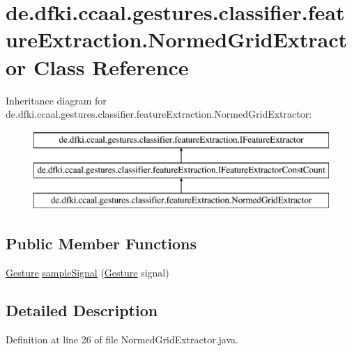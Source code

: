 \hypertarget{classde_1_1dfki_1_1ccaal_1_1gestures_1_1classifier_1_1feature_extraction_1_1_normed_grid_extractor}{\section{de.\-dfki.\-ccaal.\-gestures.\-classifier.\-feature\-Extraction.\-Normed\-Grid\-Extractor Class Reference}
\label{classde_1_1dfki_1_1ccaal_1_1gestures_1_1classifier_1_1feature_extraction_1_1_normed_grid_extractor}
}
Inheritance diagram for de.\-dfki.\-ccaal.\-gestures.\-classifier.\-feature\-Extraction.\-Normed\-Grid\-Extractor\-:\begin{figure}[H]
\begin{center}
\leavevmode
\includegraphics[height=3.000000cm]{classde_1_1dfki_1_1ccaal_1_1gestures_1_1classifier_1_1feature_extraction_1_1_normed_grid_extractor}
\end{center}
\end{figure}
\subsection*{Public Member Functions}
\begin{DoxyCompactItemize}
\item 
\hyperlink{classde_1_1dfki_1_1ccaal_1_1gestures_1_1_gesture}{Gesture} \hyperlink{classde_1_1dfki_1_1ccaal_1_1gestures_1_1classifier_1_1feature_extraction_1_1_normed_grid_extractor_aa7b3f8819597b9f006c08a0baeb39a90}{sample\-Signal} (\hyperlink{classde_1_1dfki_1_1ccaal_1_1gestures_1_1_gesture}{Gesture} signal)
\end{DoxyCompactItemize}


\subsection{Detailed Description}


Definition at line 26 of file Normed\-Grid\-Extractor.\-java.



